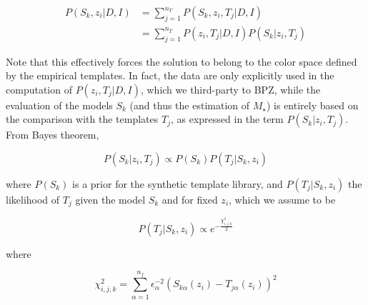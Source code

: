 \documentclass[a4paper, useAMS, usenatbib, hyperpdf]{mn2e}
\begin{document}
\begin{equation}
\label{eq:Prob_Sk}
\begin{split}
P(S_k,z_i|D,I) & = \sum_{j=1}^{n_T} P(S_k,z_i,T_j | D,I) \\
&  = \sum_{j=1}^{n_T} P(z_i,T_j | D,I) P(S_k|z_i,T_j)
\end{split}
\end{equation}



\noindent Note that this effectively forces the solution to belong to the color space defined by the empirical templates. In fact, the data are only explicitly used in the computation of $P(z_i,T_j | D,I)$, which we third-party to BPZ, while the evaluation of the models $S_k$ (and thus the estimation of $M_\star$) is entirely based on the comparison with the templates $T_j$, as expressed in the term $P(S_k | z_i,T_j)$. From Bayes theorem, 


\begin{equation}
\label{eq:prob_model}
P(S_k | z_i,T_j) \propto P(S_k) P(T_j | S_k,z_i)
\end{equation}

\noindent where $P(S_k)$ is a prior for the synthetic template library, and $P(T_j | S_k,z_i)$ the likelihood of $T_j$ given the model $S_k$ and for fixed $z_i$, which we assume to be 

\begin{equation}
\label{eq:probTS}
P(T_j | S_k, z_i) \propto e^{-\frac{\chi_{i,j,k}^2}{2}}
\end{equation}

\noindent where

\begin{equation}
\label{eq:chi2}
\chi^2_{i, j, k} =  \sum_{\alpha=1}^{n_f} \epsilon_\alpha^{-2} \left( S_{k\alpha}(z_i) - T_{j\alpha}(z_i) \right)^2
\end{equation}
\end{document}
